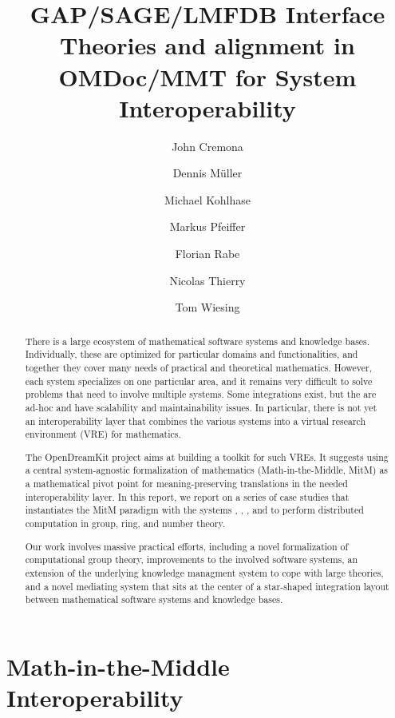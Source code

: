 \documentclass[book]{deliverablereport}
\title{GAP/SAGE/LMFDB Interface Theories and alignment in OMDoc/MMT for System Interoperability}
\author{John Cremona}
\author{Dennis M\"uller}
\author{Michael Kohlhase}
\author{Markus Pfeiffer}
\author{Florian Rabe}
\author{Nicolas Thierry}
\author{Tom Wiesing}
\def\papertype{report\xspace}
\begin{document}
\begin{abstract}
  There is a large ecosystem of mathematical software systems and knowledge bases.
  Individually, these are optimized for particular domains and functionalities, and
  together they cover many needs of practical and theoretical mathematics.  However, each
  system specializes on one particular area, and it remains very difficult to solve
  problems that need to involve multiple systems.  Some integrations exist, but the are
  ad-hoc and have scalability and maintainability issues.  In particular, there is not yet
  an interoperability layer that combines the various systems into a virtual research
  environment (VRE) for mathematics.
  
  The OpenDreamKit project aims at building a toolkit for such VREs.  It suggests using a
  central system-agnostic formalization of mathematics (Math-in-the-Middle, MitM) as a
  mathematical pivot point for meaning-preserving translations in the needed
  interoperability layer.  In this \papertype, we report on a series of case studies that
  instantiates the MitM paradigm with the systems \GAP, \Sage, \LMFDB, and
  \Singular{} to perform distributed computation in group,
  ring, and number theory.
 
  Our work involves massive practical efforts, including a novel formalization of
  computational group theory, improvements to the involved software systems, an extension
  of the underlying knowledge managment system to cope with large theories, and a novel
  mediating system that sits at the center of a star-shaped integration layout between
  mathematical software systems and knowledge bases.
\end{abstract}

\maketitle
\setcounter{tocdepth}{2}
\newpage\tableofcontents\newpage
{}



\section[MitM Interoperability]{Math-in-the-Middle Interoperability}\label{sec:mitm}

\end{document}

